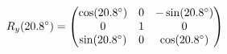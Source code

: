 \documentclass[preview]{standalone}
\begin{document}
\begin{align*}
\special{dvisvgm:raw <g id='unique000'>}R_y(20.8^\circ) = \begin{pmatrix} \cos(20.8^\circ) & 0 & -\sin(20.8^\circ) \\ 0 & 1 & 0 \\ \sin(20.8^\circ) & 0 & \cos(20.8^\circ) \end{pmatrix}\special{dvisvgm:raw </g>}
\end{align*}
\end{document}
